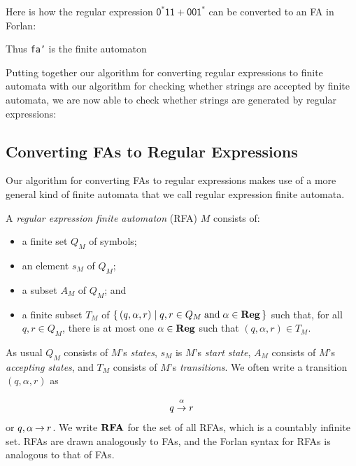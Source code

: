 Here is how the regular expression $\mathsf{0^*11+001^*}$ can
be converted to an FA in Forlan:

Thus \texttt{fa'} is the finite automaton
\begin{center}

\end{center}

Putting together our algorithm for converting regular expressions to finite
automata with our algorithm for checking whether strings are accepted by
finite automata, we are now able to check whether strings are
generated by regular expressions:


\subsection{Converting FAs to Regular Expressions}

%
%

Our algorithm for converting FAs to regular expressions makes
use of a more general kind of finite automata that we call
regular expression finite automata.

%
%
%
A \emph{regular expression finite automaton} (RFA) $M$ consists of:
\begin{itemize}
\item a finite set $Q_M$ of symbols;

\item an element $s_M$ of $Q_M$;

\item a subset $A_M$ of $Q_M$; and

\item a finite subset $T_M$ of
$\{ \, (q,{\alpha},r) \mid q,r\in Q_M\;\allowbreak\mbox{and}\allowbreak\;
{\alpha}\in{\mathbf{Reg}} \, \}$ such that,
for all $q,r\in Q_M$, there is at most one $\alpha\in\mathbf{Reg}$
such that $(q,\alpha,r)\in T_M$.
\end{itemize}
As usual $Q_M$ consists of $M$'s \emph{states}, $s_M$ is $M$'s
\emph{start state}, $A_M$ consists of $M$'s \emph{accepting states},
and $T_M$ consists of $M$'s \emph{transitions}.  We often write
a transition $(q,\alpha,r)$ as
\begin{gather*}
q\stackrel{\strut\alpha}{\rightarrow}r
\end{gather*}
or $q,\alpha\mathbin{\to} r$.
We write $\mathbf{RFA}$ for the set of all RFAs, which is a countably infinite
set.  RFAs are drawn analogously to FAs, and the Forlan syntax for
RFAs is analogous to that of FAs.

